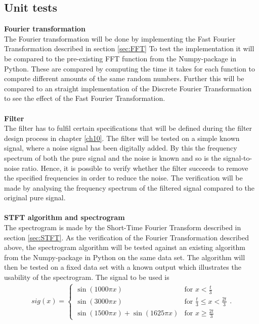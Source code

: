 \subsection{Unit tests} 
\textbf{Fourier transformation} \\
The Fourier transformation will be done by implementing the Fast Fourier Transformation described in section \ref{sec:FFT} 
To test the implementation it will be compared to the pre-existing FFT function from the Numpy-package in Python. These are compared by computing the time it takes for each function to compute different amounts of the same random numbers. Further this will be compared to an straight  implementation of the Discrete Fourier Transformation to see the effect of the Fast Fourier Transformation.\\
\\
\textbf{Filter}\\
The filter has to fulfil certain specifications that will be defined during the filter design process in chapter \ref{ch10}. The filter will be tested on a simple known signal, where a noise signal has been digitally added. By this the frequency spectrum of both the pure signal and the noise is known and so is the signal-to-noise ratio. Hence, it is possible to verify whether the filter succeeds to remove the specified frequencies in order to reduce the noise. The verification will be made by analysing the frequency spectrum of the filtered signal compared to the original pure signal. \\
\\
\textbf{STFT algorithm and spectrogram}\label{sec:STFT_spec}\\
The spectrogram is made by the Short-Time Fourier Transform described in section \ref{sec:STFT}. As the verification of the Fourier Transformation described above, the spectrogram algorithm will be tested against an existing algorithm from the Numpy-package in Python on the same data set. The algorithm will then be tested on a fixed data set with a known output which illustrates the usability of the spectrogram. The signal to be used is
\begin{align}\label{eq:SPECTROsignal}
sig(x)=\begin{cases}\sin(1000\pi x)&\text{for }x<\frac{t}{3}\\
\sin(3000\pi x)&\text{for }\frac{t}{3}\leq x < \frac{2t}{3}\\
\sin(1500\pi x)+\sin(1625\pi x)&\text{for }x\geq\frac{2t}{3}
\end{cases}.
\end{align}
